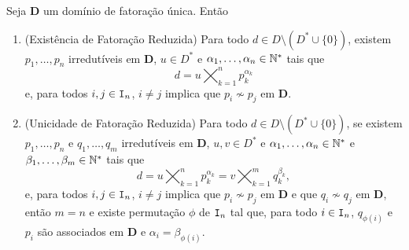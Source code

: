 \begin{prop}
	Seja $\bm D$ um domínio de fatoração única. Então
	\begin{enumerate}
	\item (Existência de Fatoração Reduzida) Para todo $d \in D \setminus (D^* \cup \{0\})$, existem $p_1,\ldots,p_n$ irredutíveis em $\bm D$, $u \in D^*$ e $\alpha_1,\ldots,\alpha_n \in \mathbb{N}^*$ tais que
	\begin{equation*}
	d=u \bigtimes_{k=1}^n p_k^{\alpha_k}
	\end{equation*}
e, para todos $i,j \in \mathtt I_n$, $i \neq j$ implica que $p_i \not\sim p_j$ em $\bm D$.
	\item (Unicidade de Fatoração Reduzida) Para todo $d \in D \setminus (D^* \cup \{0\})$, se existem $p_1,\ldots,p_n$ e $q_1,\ldots,q_m$ irredutíveis em $\bm D$, $u,v \in D^*$ e $\alpha_1,\ldots,\alpha_n \in \mathbb{N}^*$ e $\beta_1,\ldots,\beta_m \in \mathbb{N}^*$ tais que
	\begin{equation*}
	d = u \bigtimes_{k=1}^n p_k^{\alpha_k} = v \bigtimes_{k=1}^m q_k^{\beta_k},
	\end{equation*}
e, para todos $i,j \in \mathtt I_n$, $i \neq j$ implica que $p_i \not\sim p_j$ em $\bm D$ e que $q_i \not \sim q_j$ em $\bm D$, então $m=n$ e existe permutação $\phi$ de $\mathtt I_n$ tal que, para todo $i \in \mathtt I_n$, $q_{\phi(i)}$ e $p_i$ são associados em $\bm D$ e $\alpha_i=\beta_{\phi(i)}$.
	\end{enumerate}
\end{prop}
